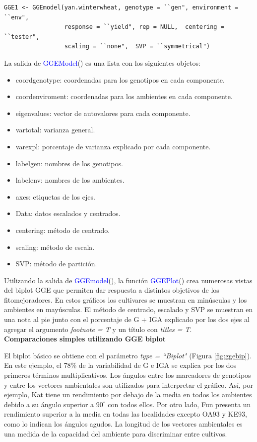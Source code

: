 \begin{tcolorbox}[colframe=aurometalsaurus,colback=backcolour,colbacklower=white,
   				width=1\linewidth,
    			height=0.12\linewidth,
    			boxsep=-3mm]
\begin{lstlisting}
GGE1 <- GGEmodel(yan.winterwheat, genotype = ``gen", environment = ``env", 
                 response = ``yield", rep = NULL,  centering = ``tester",
  				 scaling = ``none",  SVP = ``symmetrical")
\end{lstlisting}
\end{tcolorbox}


La salida de \textcolor{blue}{GGEModel}() es una lista con los siguientes objetos:
\begin{itemize}
\item coordgenotype: coordenadas para los genotipos en cada componente.
\item coordenviroment: coordenadas para los ambientes en cada componente.
\item eigenvalues: vector de autovalores para cada componente.
\item vartotal: varianza general.
\item varexpl: porcentaje de varianza explicado por cada componente.
\item labelgen: nombres de los genotipos.
\item labelenv: nombres de los ambientes.
\item axes: etiquetas de los ejes.
\item Data: datos escalados y centrados.
\item centering: método de centrado.
\item scaling: método de escala.
\item SVP: método de partición. 
\end{itemize}


Utilizando la salida de \textcolor{blue}{GGEmodel}(), la función 
\textcolor{blue}{GGEPlot}() crea numerosas vistas del biplot GGE que permiten dar respuesta a distintos objetivos de los fitomejoradores. En estos gráficos los cultivares se muestran en minúsculas y los ambientes en mayúsculas. El método de centrado, escalado y SVP se muestran en una nota al pie junto con el porcentaje de G + IGA explicado por los dos ejes al agregar el argumento \emph{footnote = T} y un título con \emph{titles = T}. \\

\textbf{Comparaciones simples utilizando GGE biplot}

El biplot básico se obtiene con el parámetro \emph{type = ``Biplot"} (Figura \ref{fig:ggebip}). En este ejemplo, el 78\% de la variabilidad de G e IGA se explica por los dos primeros términos multiplicativos. Los ángulos entre los marcadores de genotipos y entre los vectores ambientales son utilizados para interpretar el gráfico. Así, por ejemplo, Kat tiene un rendimiento por debajo de la media en todos los ambientes debido a su ángulo superior a $90^{\circ}$ con todos ellos. Por otro lado, Fun presenta un rendimiento superior a la media en todas las localidades excepto OA93 y KE93, como lo indican los ángulos agudos. La longitud de los vectores ambientales es una medida de la capacidad del ambiente para discriminar entre cultivos. 


